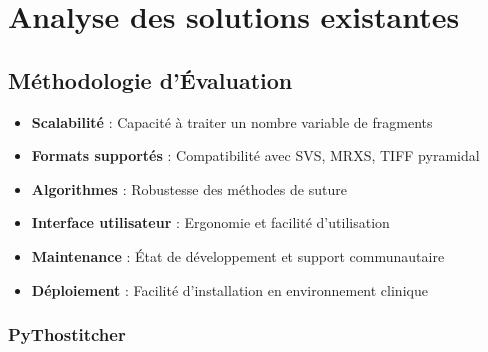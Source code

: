 \documentclass[11pt,a4paper]{report}
\begin{document}
\section{Analyse des solutions existantes}

\subsection{Méthodologie d'Évaluation}

\begin{tcolorbox}[colback=TechBlue!10, colframe=TechBlue, title=Critères d'Évaluation]
\begin{itemize}[leftmargin=*]
    \item \textbf{Scalabilité} : Capacité à traiter un nombre variable de fragments
    \item \textbf{Formats supportés} : Compatibilité avec SVS, MRXS, TIFF pyramidal
    \item \textbf{Algorithmes} : Robustesse des méthodes de suture
    \item \textbf{Interface utilisateur} : Ergonomie et facilité d'utilisation
    \item \textbf{Maintenance} : État de développement et support communautaire
    \item \textbf{Déploiement} : Facilité d'installation en environnement clinique
\end{itemize}
\end{tcolorbox}

\subsubsection{PyThostitcher}
\end{document}
